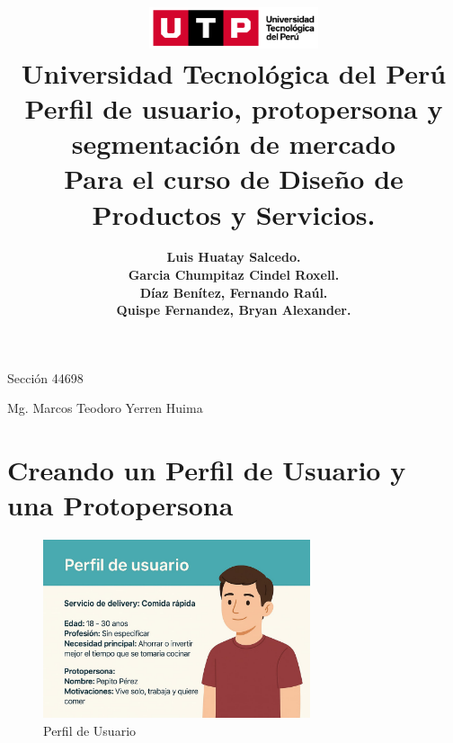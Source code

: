 \documentclass{article}
\title{
  \includegraphics[width=5cm]{./assets/logo-utp.png} \\
  \vspace{1cm}
  \textbf{Universidad Tecnológica del Perú} \\
  \vspace{2cm}
  \textbf{Perfil de usuario, protopersona y segmentación de mercado} \\
  \vspace{1cm}
  \large \textbf{Para el curso de Diseño de Productos y Servicios.}
}
\author{
  \textbf{Luis Huatay Salcedo.} \\
  \textbf{Garcia Chumpitaz Cindel Roxell.} \\
  \textbf{Díaz Benítez, Fernando Raúl.} \\
  \textbf{Quispe Fernandez, Bryan Alexander.}
}
\begin{document}
\maketitle
\begin{center}
  Sección 44698
\end{center}
\thispagestyle{empty}
\begin{center}
  Mg. Marcos Teodoro Yerren Huima  
\end{center}
\restoregeometry




\newpage
\section*{Creando un Perfil de Usuario y una Protopersona}

\begin{figure}[h!]
    \centering
    \includegraphics[width=0.7\textwidth]{assets/perfilDeUsuario.jpeg}
    \caption{Perfil de Usuario}
    \label{fig:segmentacion_mercado}
\end{figure}
\end{document}
